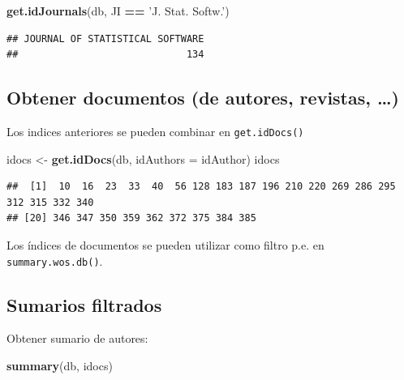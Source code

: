 \documentclass[]{book}
\newenvironment{Shaded}{\begin{snugshade}}{\end{snugshade}}
\newcommand{\KeywordTok}[1]{\textcolor[rgb]{0.13,0.29,0.53}{\textbf{#1}}}
\newcommand{\DataTypeTok}[1]{\textcolor[rgb]{0.13,0.29,0.53}{#1}}
\newcommand{\StringTok}[1]{\textcolor[rgb]{0.31,0.60,0.02}{#1}}
\newcommand{\OperatorTok}[1]{\textcolor[rgb]{0.81,0.36,0.00}{\textbf{#1}}}
\newcommand{\NormalTok}[1]{#1}
\begin{document}
\begin{itemize}
\begin{Shaded}
\begin{Highlighting}[]
\KeywordTok{get.idJournals}\NormalTok{(db, JI }\OperatorTok{==}\StringTok{ 'J. Stat. Softw.'}\NormalTok{)}
\end{Highlighting}
\end{Shaded}

\begin{verbatim}
## JOURNAL OF STATISTICAL SOFTWARE 
##                             134
\end{verbatim}
\end{itemize}

\subsection{Obtener documentos (de autores, revistas,
\ldots{})}\label{obtener-documentos-de-autores-revistas}

Los indices anteriores se pueden combinar en \texttt{get.idDocs()}

\begin{Shaded}
\begin{Highlighting}[]
\NormalTok{idocs <-}\StringTok{ }\KeywordTok{get.idDocs}\NormalTok{(db, }\DataTypeTok{idAuthors =}\NormalTok{ idAuthor)}
\NormalTok{idocs}
\end{Highlighting}
\end{Shaded}

\begin{verbatim}
##  [1]  10  16  23  33  40  56 128 183 187 196 210 220 269 286 295 312 315 332 340
## [20] 346 347 350 359 362 372 375 384 385
\end{verbatim}

Los índices de documentos se pueden utilizar como filtro p.e. en
\texttt{summary.wos.db()}.

\subsection{Sumarios filtrados}\label{sumarios-filtrados}

Obtener sumario de autores:

\begin{Shaded}
\begin{Highlighting}[]
\KeywordTok{summary}\NormalTok{(db, idocs)}
\end{Highlighting}
\end{Shaded}
\end{document}
